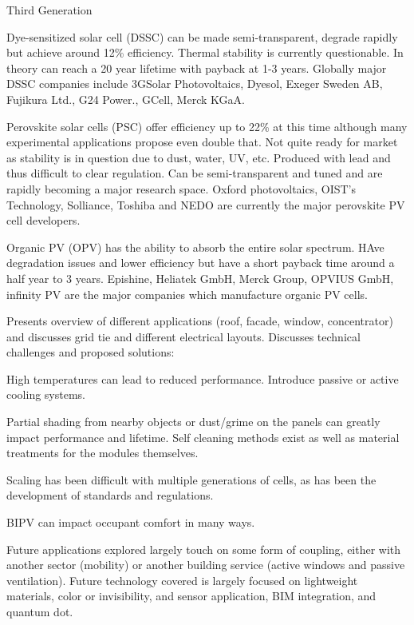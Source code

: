 \documentclass[11pt,a4paper]{article}
\newenvironment{itemize*}%
  {\begin{itemize}[rightmargin=\dimexpr\linewidth-120mm-\leftmargin\relax]%
    \setlength{\itemsep}{0pt}%
    \setlength{\parskip}{0pt}}%
  {\end{itemize}}
\begin{document}
Third Generation
\begin{itemize*}
    \item Dye-sensitized solar cell (DSSC) can be made semi-transparent, degrade rapidly but achieve around 12\% efficiency. Thermal stability is currently questionable. In theory can reach a 20 year lifetime with payback at 1-3 years. Globally major DSSC companies include 3GSolar Photovoltaics, Dyesol, Exeger Sweden AB, Fujikura Ltd., G24 Power., GCell, Merck KGaA.
    \item Perovskite solar cells (PSC) offer efficiency up to 22\% at this time although many experimental applications propose even double that. Not quite ready for market as stability is in question due to dust, water, UV, etc. Produced with lead and thus difficult to clear regulation. Can be semi-transparent and tuned and are rapidly becoming a major research space. Oxford photovoltaics, OIST’s Technology, Solliance, Toshiba and NEDO are currently the major perovskite PV cell developers.
    \item Organic PV (OPV) has the ability to absorb the entire solar spectrum. HAve degradation issues and lower efficiency but have a short payback time around a half year to 3 years. Epishine, Heliatek GmbH, Merck Group, OPVIUS GmbH, infinity PV are the major companies which manufacture organic PV cells.
\end{itemize*}
Presents overview of different applications (roof, facade, window, concentrator) and discusses grid tie and different electrical layouts. Discusses technical challenges and proposed solutions:
\begin{itemize*}
    \item High temperatures can lead to reduced performance. Introduce passive or active cooling systems.
    \item Partial shading from nearby objects or dust/grime on the panels can greatly impact performance and lifetime. Self cleaning methods exist as well as material treatments for the modules themselves.
    \item Scaling has been difficult with multiple generations of cells, as has been the development of standards and regulations.
    \item BIPV can impact occupant comfort in many ways.
\end{itemize*}
Future applications explored largely touch on some form of coupling, either with another sector (mobility) or another building service (active windows and passive ventilation). Future technology covered is largely focused on lightweight materials, color or invisibility, and sensor application, BIM integration, and quantum dot.
\end{document}
